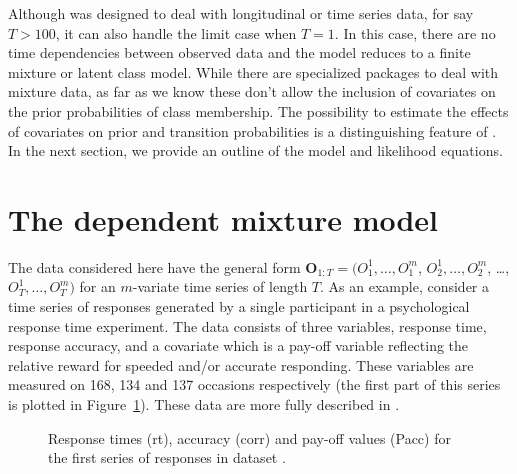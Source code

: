 \documentclass[article]{jss}
\newcommand{\vc}{\mathbf}
\begin{document}
Although  was designed to deal with longitudinal or time
series data, for say $T>100$, it can also handle the limit case when
$T=1$.  In this case, there are no time dependencies between observed
data and the model reduces to a finite mixture or latent class model.
While there are specialized packages to deal with mixture data, as far
as we know these don't allow the inclusion of covariates on the prior
probabilities of class membership.  The possibility to estimate the
effects of covariates on prior and transition probabilities is a
distinguishing feature of .  In the next section, we
provide an outline of the model and likelihood equations.


\section{The dependent mixture model}

The data considered here have the general form $\vc{O}_{1:T}=
(O_{1}^{1}, \ldots, O_{1}^{m}$, $O_{2}^{1}, \ldots, O_{2}^{m}$,
\ldots, $O_{T}^{1}, \ldots, O_{T}^{m})$ for an $m$-variate time series
of length $T$.  As an example, consider a time series of responses
generated by a single participant in a psychological response time
experiment.  The data consists of three variables, response time,
response accuracy, and a covariate which is a pay-off variable
reflecting the relative reward for speeded and/or accurate responding.
These variables are measured on 168, 134 and 137 occasions
respectively (the first part of this series is plotted in
Figure~\ref{fig:speed}).  These data are more fully described in
\citet{Dutilh2009}.

\begin{figure}[htbp]
  \begin{center}
	  \caption{Response times (rt), accuracy (corr) and pay-off values (Pacc) for
	  the first series of responses in dataset .}
	  \label{fig:speed}
  \end{center}
\end{figure}
\end{document}
